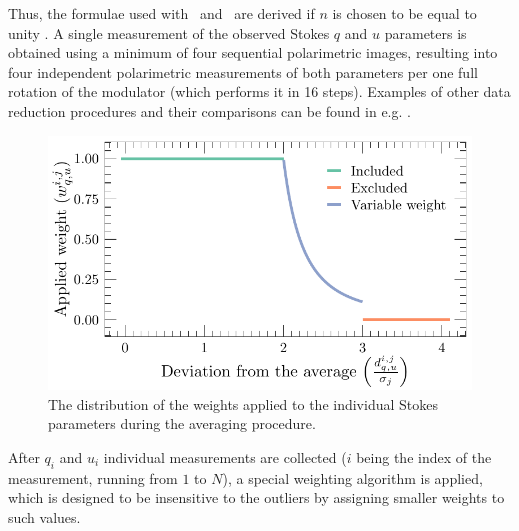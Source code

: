 Thus, the formulae used with \DP\ and \DUF\ are derived if $n$ is chosen to be equal to unity \citep[see][]{Berdyugin2019}.
A single measurement of the observed Stokes $q$ and $u$ parameters is obtained using a minimum of four sequential polarimetric images, resulting into four independent polarimetric measurements of both parameters per one full rotation of the modulator (which performs it in 16 steps).
Examples of other data reduction procedures and their comparisons can be found in e.g. \citet{Bagnulo2009}.

\begin{figure}
    \centering
    \includegraphics[keepaspectratio, width = 1\linewidth]{images/duf_weights.pdf}
    \caption{The distribution of the weights applied to the individual Stokes parameters during the averaging procedure.}
    \label{fig:dipol-uf:weights_dist}
\end{figure}

After $q_i$ and $u_i$ individual measurements are collected ($i$ being the index of the measurement, running from $1$ to $N$), a special weighting algorithm is applied, which is designed to be insensitive to the outliers by assigning smaller weights to such values.

